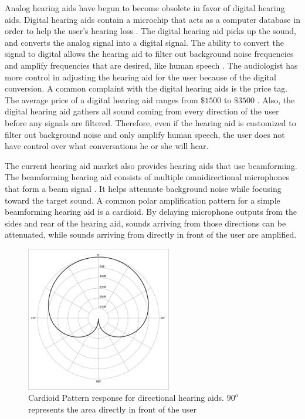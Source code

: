 \documentclass[10pt,journal,compsoc]{IEEEtran}
\begin{document}
Analog hearing aids have begun to become obsolete in favor of digital hearing aids. Digital hearing aids contain a microchip that acts as a computer database in order to help the user’s hearing loss \cite{amplifon} . The digital hearing aid picks up the sound, and converts the analog signal into a digital signal. The ability to convert the signal to digital allows the hearing aid to filter out background noise frequencies and amplify frequencies that are desired, like human speech \cite{amplifon}. The audiologist has more control in adjusting the hearing aid for the user because of the digital conversion. A common complaint with the digital hearing aids is the price tag. The average price of a digital hearing aid ranges from $\$1500$ to $\$3500$\cite{audicus} . Also, the digital hearing aid gathers all sound coming from every direction of the user before any signals are filtered. Therefore, even if the hearing aid is customized to filter out background noise and only amplify human speech, the user does not have control over what conversations he or she will hear.

The current hearing aid market also provides hearing aids that use beamforming. The beamforming hearing aid consists of multiple omnidirectional microphones that form a beam signal \cite{Staab} . It helps attenuate background noise while focusing toward the target sound. A common polar amplification pattern for a simple beamforming hearing aid is a cardioid. By delaying microphone outputs from the sides and rear of the hearing aid, sounds arriving from those directions can be attenuated, while sounds arriving from directly in front of the user are amplified.

\begin{figure}[htbp]
    \centering
    \includegraphics[width=2.5in]{cardiod}
    \caption{Cardioid Pattern response for directional hearing aids. $90^o$ represents the area directly in front of the user}
    \label{fig:cardiode}
\end{figure}
\end{document}
